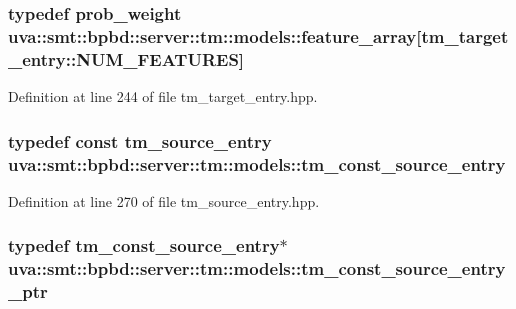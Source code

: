 \subsubsection[{feature\+\_\+array}]{\setlength{\rightskip}{0pt plus 5cm}typedef {\bf prob\+\_\+weight} uva\+::smt\+::bpbd\+::server\+::tm\+::models\+::feature\+\_\+array\mbox{[}{\bf tm\+\_\+target\+\_\+entry\+::\+N\+U\+M\+\_\+\+F\+E\+A\+T\+U\+R\+E\+S}\mbox{]}}\label{namespaceuva_1_1smt_1_1bpbd_1_1server_1_1tm_1_1models_a2181caec035a699138a4dcedfd7c2c26}


Definition at line 244 of file tm\+\_\+target\+\_\+entry.\+hpp.

\hypertarget{namespaceuva_1_1smt_1_1bpbd_1_1server_1_1tm_1_1models_a86b26049fe9aeb13a850852d897a2a77}{}
\subsubsection[{tm\+\_\+const\+\_\+source\+\_\+entry}]{\setlength{\rightskip}{0pt plus 5cm}typedef const {\bf tm\+\_\+source\+\_\+entry} {\bf uva\+::smt\+::bpbd\+::server\+::tm\+::models\+::tm\+\_\+const\+\_\+source\+\_\+entry}}\label{namespaceuva_1_1smt_1_1bpbd_1_1server_1_1tm_1_1models_a86b26049fe9aeb13a850852d897a2a77}


Definition at line 270 of file tm\+\_\+source\+\_\+entry.\+hpp.

\hypertarget{namespaceuva_1_1smt_1_1bpbd_1_1server_1_1tm_1_1models_a841bb11e4e9f70fbde7a8ca1ae533681}{}
\subsubsection[{tm\+\_\+const\+\_\+source\+\_\+entry\+\_\+ptr}]{\setlength{\rightskip}{0pt plus 5cm}typedef {\bf tm\+\_\+const\+\_\+source\+\_\+entry}$\ast$ {\bf uva\+::smt\+::bpbd\+::server\+::tm\+::models\+::tm\+\_\+const\+\_\+source\+\_\+entry\+\_\+ptr}}\label{namespaceuva_1_1smt_1_1bpbd_1_1server_1_1tm_1_1models_a841bb11e4e9f70fbde7a8ca1ae533681}


